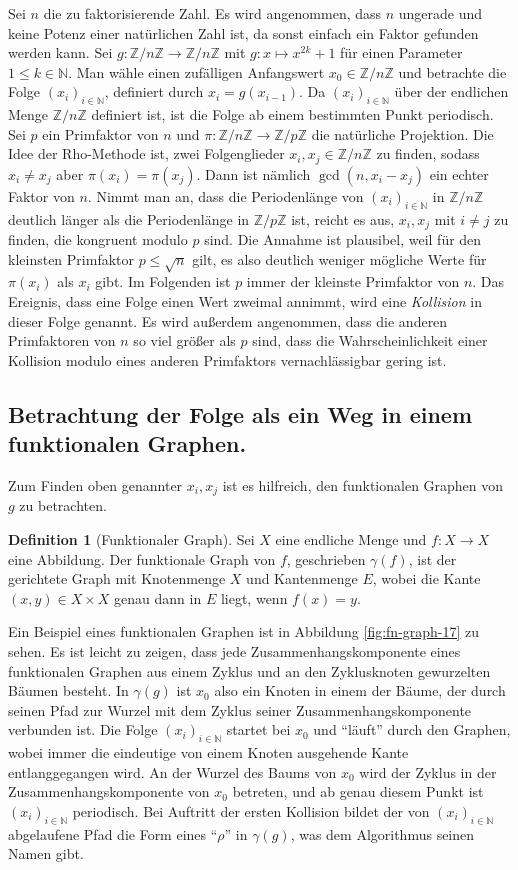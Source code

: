 \documentclass[a4paper, 11pt, ngerman]{article}
\newcommand{\N}{\mathbb{N}}
\newcommand{\Z}{\mathbb{Z}}
\theoremstyle{definition}
\newtheorem{definition}{Definition}
\theoremstyle{plain}
\theoremstyle{remark}
\begin{document}
Sei $n$ die zu faktorisierende Zahl. Es wird angenommen, dass $n$ ungerade und keine Potenz einer natürlichen Zahl ist, da sonst einfach ein Faktor gefunden werden kann. Sei $g : \Z/n\Z \to \Z/n\Z$ mit $g : x \mapsto x^{2k} + 1$ für einen Parameter $1 \le k \in \N$. Man wähle einen zufälligen Anfangswert $x_0 \in \Z/n\Z$ und betrachte die Folge $(x_i)_{i \in \N}$, definiert durch $x_i = g(x_{i - 1})$. Da $(x_i)_{i \in \N}$ über der endlichen Menge $\Z/n\Z$ definiert ist, ist die Folge ab einem bestimmten Punkt periodisch. Sei $p$ ein Primfaktor von $n$ und $\pi : \Z/n\Z \to \Z/p\Z$ die natürliche Projektion. Die Idee der Rho-Methode ist, zwei Folgenglieder $x_i, x_j \in \Z/n\Z$ zu finden, sodass $x_i \ne x_j$ aber $\pi(x_i) = \pi(x_j)$. Dann ist nämlich $\gcd(n, x_i - x_j)$ ein echter Faktor von $n$. Nimmt man an, dass die Periodenlänge von $(x_i)_{i \in \N}$ in $\Z/n\Z$ deutlich länger als die Periodenlänge in $\Z/p\Z$ ist, reicht es aus, $x_i, x_j$ mit $i \ne j$ zu finden, die kongruent modulo $p$ sind. Die Annahme ist plausibel, weil für den kleinsten Primfaktor $p \le \sqrt n$ gilt, es also deutlich weniger mögliche Werte für $\pi(x_i)$ als $x_i$ gibt. Im Folgenden ist $p$ immer der kleinste Primfaktor von $n$. Das Ereignis, dass eine Folge einen Wert zweimal annimmt, wird eine \emph{Kollision} in dieser Folge genannt. Es wird außerdem angenommen, dass die anderen Primfaktoren von $n$ so viel größer als $p$ sind, dass die Wahrscheinlichkeit einer Kollision modulo eines anderen Primfaktors vernachlässigbar gering ist.

\subsection{Betrachtung der Folge als ein Weg in einem funktionalen Graphen.}

Zum Finden oben genannter $x_i, x_j$ ist es hilfreich, den funktionalen Graphen von $g$ zu betrachten.

\begin{definition}[Funktionaler Graph]
    Sei $X$ eine endliche Menge und $f: X \to X$ eine Abbildung. Der funktionale Graph von $f$, geschrieben $\gamma(f)$, ist der gerichtete Graph mit Knotenmenge $X$ und Kantenmenge $E$, wobei die Kante $(x, y) \in X \times X$ genau dann in $E$ liegt, wenn $f(x) = y$.
\end{definition}

Ein Beispiel eines funktionalen Graphen ist in Abbildung \ref{fig:fn-graph-17} zu sehen. Es ist leicht zu zeigen, dass jede Zusammenhangskomponente eines funktionalen Graphen aus einem Zyklus und an den Zyklusknoten gewurzelten Bäumen besteht. In $\gamma(g)$ ist $x_0$ also ein Knoten in einem der Bäume, der durch seinen Pfad zur Wurzel mit dem Zyklus seiner Zusammenhangskomponente verbunden ist. Die Folge $(x_i)_{i \in \N}$ startet bei $x_0$ und "`läuft"' durch den Graphen, wobei immer die eindeutige von einem Knoten ausgehende Kante entlanggegangen wird. An der Wurzel des Baums von $x_0$ wird der Zyklus in der Zusammenhangskomponente von $x_0$ betreten, und ab genau diesem Punkt ist $(x_i)_{i \in \N}$ periodisch. Bei Auftritt der ersten Kollision bildet der von $(x_i)_{i \in \N}$ abgelaufene Pfad die Form eines "`$\rho$"' in $\gamma(g)$, was dem Algorithmus seinen Namen gibt.
\end{document}
